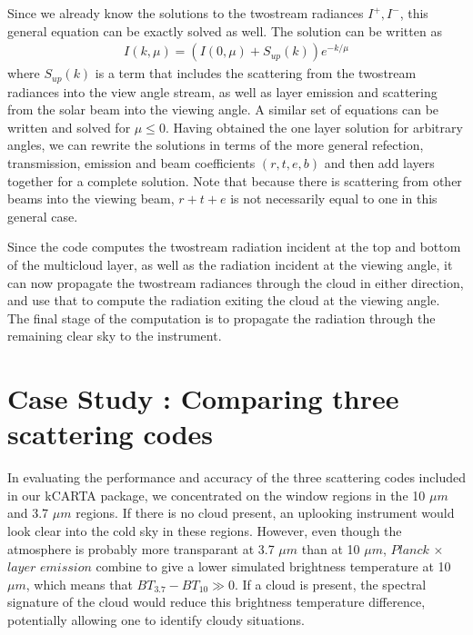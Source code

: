 \documentclass[11pt]{article}
\begin{document}
Since we already know the solutions to the twostream radiances $I^{+},I^{-}$,
this general equation can be exactly solved as well. The solution can be 
written as
\[
\begin{array}{ccc}
I(k,\mu) = \left( I(0,\mu) + S_{up}(k) \right) e^{-k/\mu}
\end{array}
\]
where $S_{up}(k)$ is a term that includes the scattering from the twostream
radiances into the view angle stream, as well as layer emission and 
scattering from the solar beam into the viewing angle. A similar set of 
equations can be written and solved for $\mu \leq 0$. Having obtained the one
layer solution for arbitrary angles, we can rewrite the solutions in terms 
of the more general refection, transmission, emission and beam coefficients
$(r,t,e,b)$ and then add layers together for a complete solution. Note that 
because there is scattering from other beams into the viewing beam, $r+t+e$ 
is not necessarily equal to one in this general case. 

Since the code computes the twostream radiation incident at the top and
bottom of the multicloud layer, as well as the radiation incident at the
viewing angle, it can now propagate the twostream radiances through the cloud 
in either direction, and use that to compute the radiation exiting the cloud 
at the viewing angle. The final stage of the computation is to propagate the 
radiation through the remaining clear sky to the instrument.

\section{Case Study  : Comparing three scattering codes}

In evaluating the performance and accuracy of the three scattering codes 
included in our \textsf{kCARTA} package, we concentrated on the window regions
in the 10 $\mu m$ and 3.7 $\mu m$ regions. If there is no cloud present, an 
uplooking instrument would look clear into the cold sky in these regions.
However, even though the atmosphere is probably more transparant at 
3.7 $\mu m$ than at 10 $\mu m$, $Planck$ $\times$ $layer$ $emission$ combine 
to give a lower simulated brightness temperature at 10 $\mu m$, which means 
that $BT_{3.7} - BT_{10} \gg 0$. If a cloud is present, the spectral 
signature of the cloud would reduce this brightness temperature difference, 
potentially allowing one to identify cloudy situations. 
\end{document}
